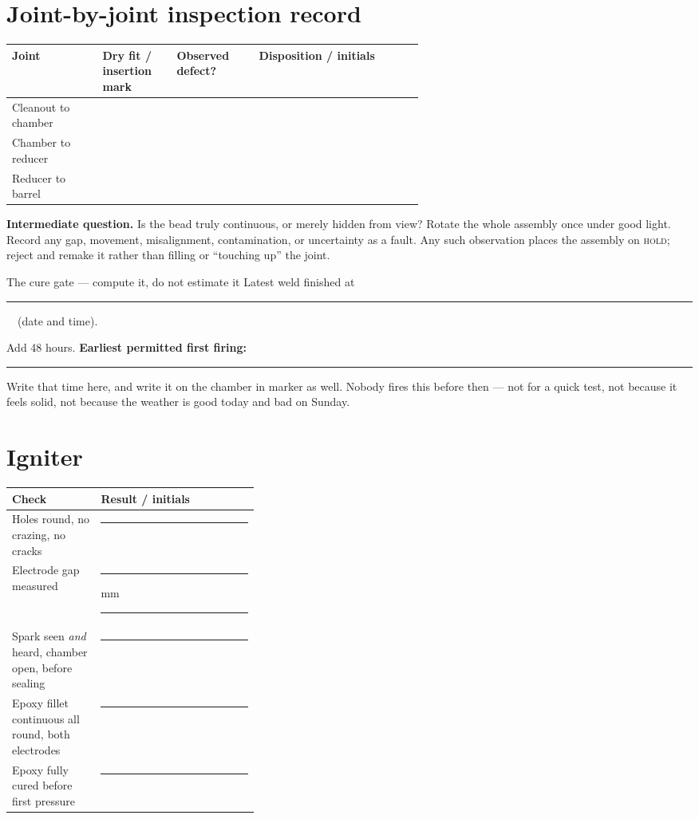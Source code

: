 \section{Joint-by-joint inspection record}
\begin{tabularx}{\linewidth}{@{}p{0.22\linewidth}p{0.18\linewidth}p{0.20\linewidth}L@{}}
\toprule
\textbf{Joint} & \textbf{Dry fit / insertion mark} & \textbf{Observed defect?} & \textbf{Disposition / initials}\\
\midrule
Cleanout to chamber & & & \\[0.8em]
Chamber to reducer & & & \\[0.8em]
Reducer to barrel & & & \\
\bottomrule
\end{tabularx}

\begin{telosframe}
\textbf{Intermediate question.} Is the bead truly continuous, or merely hidden
from view? Rotate the whole assembly once under good light. Record any gap,
movement, misalignment, contamination, or uncertainty as a fault. Any such
observation places the assembly on \textsc{hold}; reject and remake it rather
than filling or ``touching up'' the joint.
\end{telosframe}

\vspace{0.4em}
\begin{gate}{The cure gate --- compute it, do not estimate it}
Latest weld finished at \rule{0.30\linewidth}{0.4pt}\ \ (date and time).\par
\vspace{0.5em}
Add 48 hours. \textbf{Earliest permitted first firing:}
\rule{0.42\linewidth}{0.4pt}\par
\vspace{0.5em}
Write that time here, and write it on the chamber in marker as well. Nobody
fires this before then --- not for a quick test, not because it feels solid, not
because the weather is good today and bad on Sunday.
\end{gate}

\section{Igniter}
\begin{tabularx}{\linewidth}{@{}p{0.36\linewidth}L@{}}
\toprule
\textbf{Check} & \textbf{Result / initials}\\
\midrule
Holes round, no crazing, no cracks & \rule{0.7\linewidth}{0.4pt}\\[0.5em]
Electrode gap measured & \rule{0.35\linewidth}{0.4pt} mm \hfill \rule{0.3\linewidth}{0.4pt}\\[0.5em]
Spark seen \emph{and} heard, chamber open, before sealing & \rule{0.7\linewidth}{0.4pt}\\[0.5em]
Epoxy fillet continuous all round, both electrodes & \rule{0.7\linewidth}{0.4pt}\\[0.5em]
Epoxy fully cured before first pressure & \rule{0.7\linewidth}{0.4pt}\\
\bottomrule
\end{tabularx}

